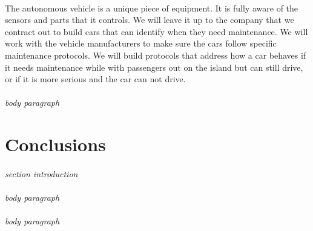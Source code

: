 \documentclass[12pt]{article}
\begin{document}
	\paragraph{} The autonomous vehicle is a unique piece of equipment. It is fully 
	aware of the sensors and parts that it controls. We will leave it up to the 
	company that we contract out to build cars that can identify when they need 
	maintenance. We will work with the vehicle manufacturers to make sure the cars 
	follow specific maintenance protocols. We will build protocols that address how 
	a car behaves if it needs maintenance while with passengers out on the island but 
	can still drive, or if it is more serious and the car can not drive.
	
	\paragraph{} \textit{body paragraph}
	
\section{Conclusions}
\paragraph{} \textit{section introduction} 
\paragraph{} \textit{body paragraph}
\paragraph{} \textit{body paragraph}
\pagebreak

\end{document}
